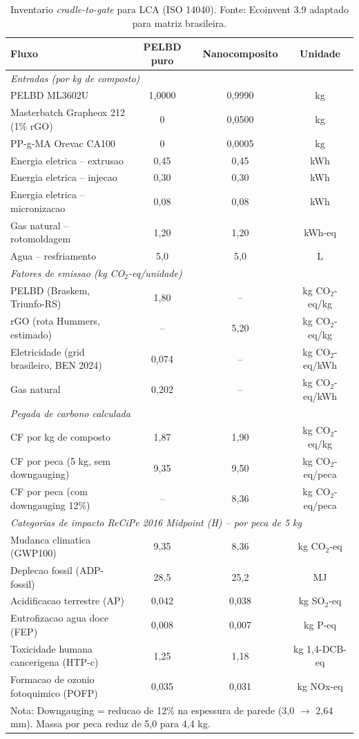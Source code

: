\documentclass[11pt,a4paper]{article}
\begin{document}
\begin{table}[H]\centering
\caption{Inventario \textit{cradle-to-gate} para LCA (ISO 14040). Fonte: Ecoinvent 3.9 adaptado para matriz brasileira.}\label{tab:lca}
\begin{tabular}{lccc}
\toprule
{\bfseries Fluxo} & {\bfseries PELBD puro} & {\bfseries Nanocomposito} & {\bfseries Unidade} \\
\midrule
\multicolumn{4}{l}{\textit{Entradas (por kg de composto)}} \\
\midrule
PELBD ML3602U & 1,0000 & 0,9990 & kg \\
Masterbatch Grapheox 212 (1\% rGO) & 0 & 0,0500 & kg \\
PP-g-MA Orevac CA100 & 0 & 0,0005 & kg \\
Energia eletrica -- extrusao & 0,45 & 0,45 & kWh \\
Energia eletrica -- injecao & 0,30 & 0,30 & kWh \\
Energia eletrica -- micronizacao & 0,08 & 0,08 & kWh \\
Gas natural -- rotomoldagem & 1,20 & 1,20 & kWh-eq \\
Agua -- resfriamento & 5,0 & 5,0 & L \\
\midrule
\multicolumn{4}{l}{\textit{Fatores de emissao (kg CO$_2$-eq/unidade)}} \\
\midrule
PELBD (Braskem, Triunfo-RS) & 1,80 & -- & kg CO$_2$-eq/kg \\
rGO (rota Hummers, estimado) & -- & 5,20 & kg CO$_2$-eq/kg \\
Eletricidade (grid brasileiro, BEN 2024) & 0,074 & -- & kg CO$_2$-eq/kWh \\
Gas natural & 0,202 & -- & kg CO$_2$-eq/kWh \\
\midrule
\multicolumn{4}{l}{\textit{Pegada de carbono calculada}} \\
\midrule
CF por kg de composto & 1,87 & 1,90 & kg CO$_2$-eq/kg \\
CF por peca (5 kg, sem downgauging) & 9,35 & 9,50 & kg CO$_2$-eq/peca \\
CF por peca (com downgauging 12\%) & -- & 8,36 & kg CO$_2$-eq/peca \\
\midrule
\multicolumn{4}{l}{\textit{Categorias de impacto ReCiPe 2016 Midpoint (H) -- por peca de 5 kg}} \\
\midrule
Mudanca climatica (GWP100) & 9,35 & 8,36 & kg CO$_2$-eq \\
Deplecao fossil (ADP-fossil) & 28,5 & 25,2 & MJ \\
Acidificacao terrestre (AP) & 0,042 & 0,038 & kg SO$_2$-eq \\
Eutrofizacao agua doce (FEP) & 0,008 & 0,007 & kg P-eq \\
Toxicidade humana cancerigena (HTP-c) & 1,25 & 1,18 & kg 1,4-DCB-eq \\
Formacao de ozonio fotoquimico (POFP) & 0,035 & 0,031 & kg NOx-eq \\
\bottomrule
\multicolumn{4}{l}{Nota: Downgauging = reducao de 12\% na espessura de parede (3,0 $\rightarrow$ 2,64 mm). Massa por peca reduz de 5,0 para 4,4 kg.} \\
\end{tabular}
\end{table}
\end{document}

